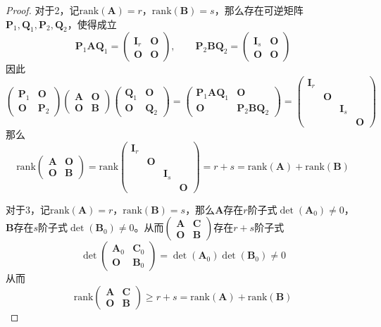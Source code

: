 \documentclass[lang = cn, scheme = chinese, thmcnt = section]{elegantbook}
\newcommand{\bs}{\boldsymbol}          %
\newcommand{\rank}{\text{rank}}        %
\begin{document}
\begin{proof}
	对于2，记$\rank(\bs{A})=r$，$\rank(\bs{B})=s$，那么存在可逆矩阵$\bs{P}_1,\bs{Q}_1,\bs{P}_2,\bs{Q}_2$，使得成立%
	$$
	\bs{P}_1\bs{A}\bs{Q}_1=\begin{pmatrix}
		\bs{I}_r & \bs{O}\\
		\bs{O} & \bs{O}
	\end{pmatrix},\qquad
	\bs{P}_2\bs{B}\bs{Q}_2=\begin{pmatrix}
		\bs{I}_s & \bs{O}\\
		\bs{O} & \bs{O}
	\end{pmatrix}
	$$
	因此%
	$$
	\begin{pmatrix}
		\bs{P}_1 & \bs{O}\\
		\bs{O} & \bs{P}_2
	\end{pmatrix}
	\begin{pmatrix}
		\bs{A} & \bs{O}\\
		\bs{O} & \bs{B}
	\end{pmatrix}
	\begin{pmatrix}
		\bs{Q}_1 & \bs{O}\\
		\bs{O} & \bs{Q}_2
	\end{pmatrix}
	=\begin{pmatrix}
		\bs{P}_1\bs{A}\bs{Q}_1 & \bs{O}\\
		\bs{O} & \bs{P}_2\bs{B}\bs{Q}_2
	\end{pmatrix}
	=\begin{pmatrix}
		\bs{I}_r &  &  & \\
		& \bs{O} & &\\
		& & \bs{I}_s &\\
		& & & \bs{O}
	\end{pmatrix}
	$$
	那么
	$$
	\rank\begin{pmatrix}
		\bs{A} & \bs{O}\\
		\bs{O} & \bs{B}
	\end{pmatrix}
	= \rank\begin{pmatrix}
		\bs{I}_r &  &  & \\
		& \bs{O} & &\\
		& & \bs{I}_s &\\
		& & & \bs{O}
	\end{pmatrix}
	= r + s
	=\rank(\bs{A})+\rank(\bs{B})
	$$
	
	对于3，记$\rank(\bs{A})=r$，$\rank(\bs{B})=s$，那么$\bs{A}$存在$r$阶子式$\det(\bs{A}_0)\ne 0$，$\bs{B}$存在$s$阶子式$\det(\bs{B}_0)\ne 0$。从而$\begin{pmatrix}\bs{A} & \bs{C}\\\bs{O} & \bs{B}\end{pmatrix}$存在$r+s$阶子式%
	$$
	\det\begin{pmatrix}
		\bs{A}_0 & \bs{C}_0\\
		\bs{O} & \bs{B}_0
	\end{pmatrix}
	=\det(\bs{A}_0)\det(\bs{B}_0)\ne 0
	$$
	从而%
	$$
	\rank\begin{pmatrix}
		\bs{A} & \bs{C}\\
		\bs{O} & \bs{B}
	\end{pmatrix}
	\ge r+s=\rank(\bs{A})+\rank(\bs{B})
	$$
\end{proof}
\end{document}
